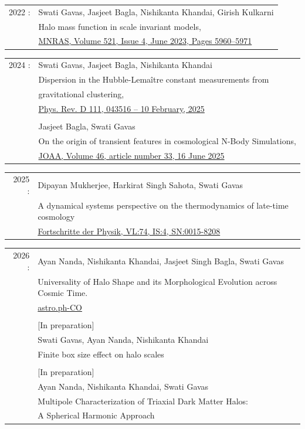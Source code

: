 \documentclass[a4paper,10pt]{article}
\begin{document}
\begin{tabular}{rl}
    \textsc{2022 :} & Swati Gavas, Jasjeet Bagla, Nishikanta Khandai, Girish Kulkarni\\ & Halo mass function in scale invariant models,\\& \href{https://doi.org/10.1093/mnras/stad935}{MNRAS, Volume 521, Issue 4, June 2023, Pages 5960–5971}   \\
\end{tabular}

\begin{tabular}{rl}
    \textsc{2024 :} & Swati Gavas, Jasjeet Bagla, Nishikanta Khandai\\ & Dispersion in the Hubble-Lema\^itre constant measurements from \\ & gravitational clustering,\\ & \href{https://journals.aps.org/prd/abstract/10.1103/PhysRevD.111.043516}{Phys. Rev. D 111, 043516 – 10 February, 2025}   \\
\\
 & Jasjeet Bagla, Swati Gavas\\ & On the origin of transient features in cosmological N-Body Simulations,\\ &\href{https://link.springer.com/article/10.1007/s12036-025-10055-x}{JOAA, Volume 46, article number 33, 16 June 2025}   \\
\end{tabular}

\begin{tabular}{rl}
    \textsc{2025 :} & Dipayan Mukherjee, Harkirat Singh Sahota, Swati Gavas\\ & A dynamical systems perspective on the thermodynamics of late-time cosmology\\&
    \href{https://onlinelibrary.wiley.com/doi/10.1002/prop.70094}{Fortschritte der Physik, VL:74, IS:4, SN:0015-8208}\\
\end{tabular}

\begin{tabular}{rl}
    \textsc{2026 :}
 & Ayan Nanda, Nishikanta Khandai, Jasjeet Singh Bagla, Swati Gavas\\ & Universality of Halo Shape and its Morphological Evolution across Cosmic Time.\\ &
 \href{https://arxiv.org/abs/2603.26640}{astro.ph-CO}\\
\\
& [In preparation]\\ & Swati Gavas, Ayan Nanda, Nishikanta Khandai\\ & Finite box size effect on halo scales\\ %
\\
& [In preparation]\\ & {Ayan Nanda, Nishikanta Khandai, Swati Gavas}\\ & Multipole Characterization of Triaxial Dark Matter Halos:\\& A Spherical Harmonic Approach\\ %
\end{tabular}
\end{document}
